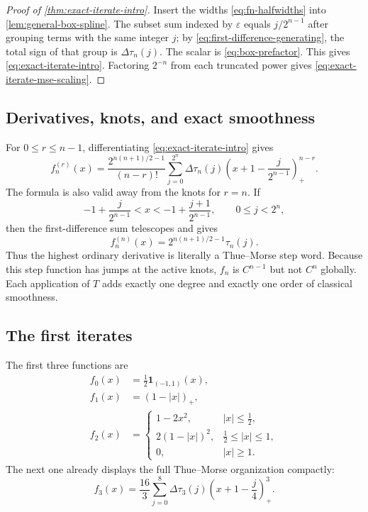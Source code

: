 \documentclass[11pt,oneside]{article}
\theoremstyle{definition}
\theoremstyle{remark}
\newcommand{\ind}{\mathbf 1}
\newcommand{\pos}[1]{\left(#1\right)_{+}}
\begin{document}
\begin{proof}[Proof of \cref{thm:exact-iterate-intro}]
Insert the widths \eqref{eq:fn-halfwidths} into \cref{lem:general-box-spline}.  The
subset sum indexed by $\varepsilon$ equals $j/2^{n-1}$ after grouping terms with the same
integer $j$; by \eqref{eq:first-difference-generating}, the total sign of that group is
$\Delta\tau_n(j)$.  The scalar is \eqref{eq:box-prefactor}.  This gives
\eqref{eq:exact-iterate-intro}.  Factoring $2^{-n}$ from each truncated power gives
\eqref{eq:exact-iterate-mse-scaling}.
\end{proof}

\subsection{Derivatives, knots, and exact smoothness}

For $0\le r\le n-1$, differentiating \eqref{eq:exact-iterate-intro} gives
\begin{equation}
 f_n^{(r)}(x)=
 \frac{2^{n(n+1)/2-1}}{(n-r)!}
 \sum_{j=0}^{2^n}\Delta\tau_n(j)
 \pos{x+1-\frac{j}{2^{n-1}}}^{n-r}.
 \label{eq:finite-spline-derivatives}
\end{equation}
The formula is also valid away from the knots for $r=n$.  If
\begin{equation}
 -1+\frac{j}{2^{n-1}}<x<-1+\frac{j+1}{2^{n-1}},
 \qquad 0\le j<2^n,
 \label{eq:open-cell}
\end{equation}
then the first-difference sum telescopes and gives
\begin{equation}
 \boxed{\displaystyle
 f_n^{(n)}(x)=2^{n(n+1)/2-1}\tau_n(j).}
 \label{eq:top-derivative-thue-morse}
\end{equation}
Thus the highest ordinary derivative is literally a Thue--Morse step word.  Because this
step function has jumps at the active knots, $f_n$ is $C^{n-1}$ but not $C^n$ globally.  Each
application of $T$ adds exactly one degree and exactly one order of classical smoothness.

\subsection{The first iterates}

The first three functions are
\begin{align}
 f_0(x)&=\frac12\ind_{(-1,1)}(x),
 \label{eq:f0-explicit}\\
 f_1(x)&=\pos{1-|x|},
 \label{eq:f1-explicit}\\
 f_2(x)&=
 \begin{cases}
 1-2x^2,&|x|\le\tfrac12,\\
 2(1-|x|)^2,&\tfrac12\le|x|\le1,\\
 0,&|x|\ge1.
 \end{cases}
 \label{eq:f2-explicit}
\end{align}
The next one already displays the full Thue--Morse organization compactly:
\begin{equation}
 f_3(x)=\frac{16}{3}\sum_{j=0}^{8}\Delta\tau_3(j)
 \pos{x+1-\frac j4}^{3}.
 \label{eq:f3-truncated-power}
\end{equation}
\end{document}
